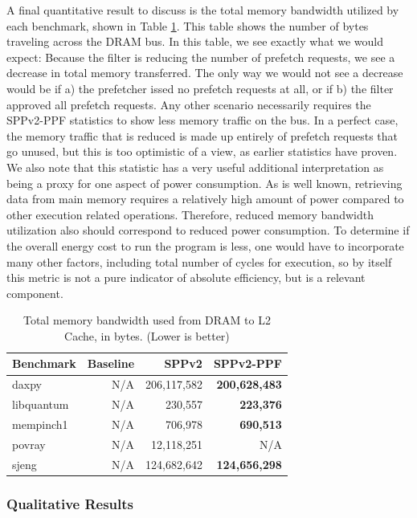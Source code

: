\documentclass[10pt,conference]{IEEEtran}
\begin{document}
A final quantitative result to discuss is the total memory bandwidth utilized by each benchmark, shown in Table \ref{tab:mem}. This table shows the number of bytes traveling across the DRAM bus. In this table, we see exactly what we would expect: Because the filter is reducing the number of prefetch requests, we see a decrease in total memory transferred. The only way we would not see a decrease would be if a) the prefetcher issed no prefetch requests at all, or if b) the filter approved all prefetch requests. Any other scenario necessarily requires the SPPv2-PPF statistics to show less memory traffic on the bus. In a perfect case, the memory traffic that is reduced is made up entirely of prefetch requests that go unused, but this is too optimistic of a view, as earlier statistics have proven. We also note that this statistic has a very useful additional interpretation as being a proxy for one aspect of power consumption. As is well known, retrieving data from main memory requires a relatively high amount of power compared to other execution related operations. Therefore, reduced memory bandwidth utilization also should correspond to reduced power consumption. To determine if the overall energy cost to run the program is less, one would have to incorporate many other factors, including total number of cycles for execution, so by itself this metric is not a pure indicator of absolute efficiency, but is a relevant component.

\begin{table}[ht]
\caption{Total memory bandwidth used from DRAM to L2 Cache, in bytes. (Lower is better)}
\centering
\begin{tabular}{l|rrr}
 Benchmark &  Baseline &        SPPv2 &    SPPv2-PPF \\
\hline
daxpy      &       N/A &  206,117,582 &  \textbf{200,628,483} \\
libquantum &       N/A &     230,557 &     \textbf{223,376} \\
mempinch1  &       N/A &     706,978 &     \textbf{690,513} \\
povray     &       N/A &   12,118,251 &        N/A \\
sjeng      &       N/A &  124,682,642 &  \textbf{124,656,298} \\
\end{tabular}
\label{tab:mem}
\end{table}

\subsubsection{Qualitative Results}
\end{document}
